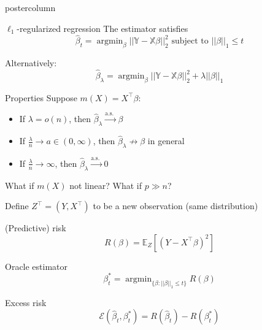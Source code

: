 \documentclass[final]{beamer}
\newcommand{\X}{\mathbb{X}}
\DeclareMathOperator*{\argmin}{argmin}
\newcommand{\alo}[1]{\textcolor{orangemain}{#1}}
\newcommand{\alr}[1]{\textcolor{redmain}{#1}}
\newcommand{\alb}[1]{\textcolor{bluemain}{#1}}
\renewcommand{\hat}{\widehat}
\newcommand{\vsp}{\vspace{.2in}}
\newcommand{\bluebox}{\hspace{1em}\alb{\raisebox{.25ex}{\rule{1ex}{1ex}}}\hspace{1ex}}
\begin{document}
\begin{frame}
\begin{columns}
\begin{column}{.49\textwidth}
\begin{beamercolorbox}[center,wd=\textwidth]{postercolumn}
\begin{minipage}[T]{.96\textwidth}
{\begin{block}{$\ell_1$-regularized regression}
              The estimator satisfies
              \[
              \hat\beta_t = \argmin_{\beta}
              ||\mathbb{Y}-\X\beta||_2^2 \textrm{ subject to }
              ||\beta||_1 \leq t 
              \]
              
              \vsp
              Alternatively:
              \[
              \hat\beta_\lambda = \argmin_{\beta}
              ||\mathbb{Y}-\X\beta||_2^2 + \lambda ||\beta||_1 
              \]
            \end{block}
            \vfill
            \begin{block}{Properties}
              Suppose \alr{$m(X) = X^\top \beta$:}
              
              \vsp
              \begin{itemize}
              \item[]\bluebox If $\lambda = o(n)$, then $\hat\beta_{\lambda}
                \stackrel{\textrm{a.s. }}{\rightarrow} \beta$  
                \vsp
              \item[]\bluebox If $\frac{\lambda}{n} \rightarrow a \in
                (0,\infty)$, then $\hat\beta_{\lambda} \nrightarrow
                \beta$ in general 
                \vsp
              \item[]\bluebox If $\frac{\lambda}{n} \rightarrow \infty$, then
                $\hat\beta_{\lambda}
                \stackrel{\textrm{a.s. }}{\rightarrow} 0$ 
                \vsp
              \end{itemize}
              \alr{What if $m(X)$ not linear? What if $p\gg n$?}
              \vsp
            \end{block}
            \vfill
                Define $Z^\top = (Y,X^\top)$ to be a new observation
                (same distribution)
               
                \vsp
                \alo{(Predictive) risk} 
                \[
                R(\beta) = \mathbb{E}_{Z} \left[(Y -
                X^\top \beta)^2\right]
                \]
                
                \vsp
                \alo{Oracle estimator}
                \[
                \beta_t^* = \argmin_{\{\beta:||\beta||_1 \leq t\}} R(\beta)
                \]
                
                \vsp
                \alo{Excess risk}
                \[
                \mathcal{E}(\hat\beta_t,\beta_t^*) = R(\hat\beta_t) - R(\beta_t^*)
                \]
                
}
\end{minipage}
\end{beamercolorbox}
\end{column}
\end{columns}
\end{frame}
\end{document}
